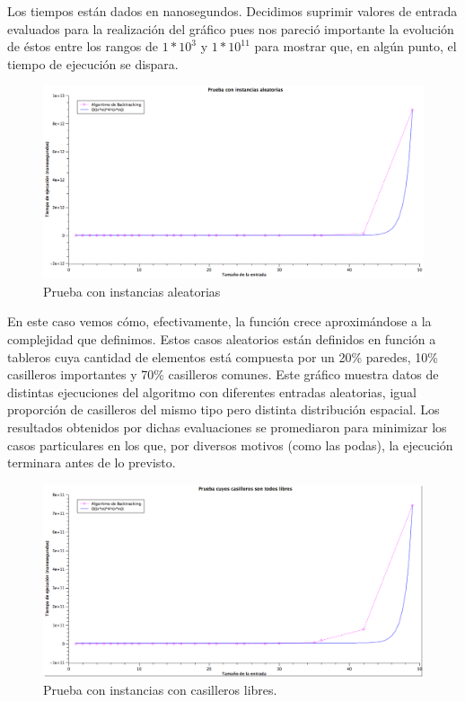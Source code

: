 Los tiempos están dados en nanosegundos. Decidimos suprimir valores de entrada evaluados para la realización del gráfico pues nos pareció importante la evolución de éstos entre los rangos de $1*10^{3}$ y $1*10^{11}$ para mostrar que, en algún punto, el tiempo de ejecución se dispara.

\begin{figure}[H] %
\begin{center}
\includegraphics[width=460pt]{../imgs/graficoej3_aleatorio.png}
\end{center}
\caption{Prueba con instancias aleatorias}
\end{figure}

En este caso vemos cómo, efectivamente, la función crece aproximándose a la complejidad que definimos. Estos casos aleatorios están definidos en función a tableros cuya cantidad de elementos está compuesta por un 20\% paredes, 10\% casilleros importantes y 70\% casilleros comunes. Este gráfico muestra datos de distintas ejecuciones del algoritmo con diferentes entradas aleatorias, igual proporción de casilleros del mismo tipo pero distinta distribución espacial. Los resultados obtenidos por dichas evaluaciones se promediaron para minimizar los casos particulares en los que, por diversos motivos (como las podas), la ejecución terminara antes de lo previsto.


\begin{figure}[H] %
\begin{center}
\includegraphics[width=460pt]{../imgs/graficoej3_todosUno.png}
\end{center}
\caption{Prueba con instancias con casilleros libres.}
\end{figure}

